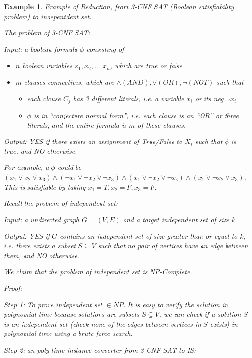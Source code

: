 \documentclass[twoside]{article}
\newtheorem{protoexample}[prototheorem]{Example}
\newenvironment{example}
{\colorlet{shadecolor}{red!15}\begin{shaded}\begin{protoexample}\normalfont}
		{\end{protoexample}\end{shaded}}
\begin{document}
\begin{example}
	Example of Reduction, from 3-CNF SAT (Boolean satisfiability problem) to indepentdent set. 
		
	The problem of 3-CNF SAT: 
		
	Input: a boolean formula $\phi$ consisting of \begin{itemize}
	\item $n$ boolean variables $x_1, x_2, ..., x_n$, which are true or false
	\item $m$ clauses connectives, which are $\land(AND), \lor(OR), \neg(NOT)$ such that \begin{itemize}
	\item each clause $C_j$ has 3 different literals, i.e. a variable $x_i$ or its neg $\neg x_i$
	\item $\phi$ is in ``conjecture normal form'', i.e. each clause is an ``OR'' or three literals, and the entire formula is $m$ of these clauses. 
	\end{itemize} 
	\end{itemize}
	
	Output: YES if there exists an assignment of True/False to $X_i$ such that $\phi$ is true, and NO otherwise. 
		
	For example, a $\phi$ could be $(x_1 \lor x_2 \lor x_3) \land (\neg x_1 \lor \neg x_2 \lor \neg x_3) \land (x_1 \lor \neg x_2 \lor \neg x_3) \land (x_1 \lor \neg x_2 \lor x_3)$. This is satisfiable by taking $x_1 = T, x_2 = F, x_3 = F$. 
		
	Recall the problem of independent set: 
		
	Input: a undirected graph $G = (V, E)$ and a target independent set of size $k$
		
	Output: YES if $G$ contains an independent set of size greater than or equal to $k$, i.e. there exists a subset $S \subseteq V$ such that no pair of vertices have an edge between them, and NO otherwise. 
		
	We claim that the problem of independent set is NP-Complete. 
		
	Proof: 
		
	Step 1: To prove independent set $ \in NP$. It is easy to verify the solution in polynomial time because solutions are subsets $S \subseteq V$, we can check if a solution $S$ is an independent set (check none of the edges between vertices in $S$ exists) in polynomial time using a brute force search. 
		
	Step 2: an poly-time instance converter from 3-CNF SAT to IS: 
		

\end{example}
\end{document}
